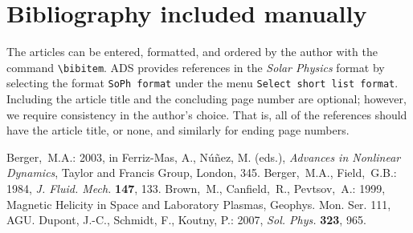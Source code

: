 \documentclass[namedreferences,hyperref,optionalrh]{spr-sola}
\newcommand{\solphys}{{\it Sol. Phys.}}
\begin{document}
\section*{Bibliography included manually }
  The articles can be entered, formatted, and ordered  
by the author with the command \verb+\bibitem+.  ADS provides
references in the {\it Solar Physics} format by selecting
the format \verb+SoPh format+ under the menu 
\verb+Select short list format+.    Including the article title
and the concluding page number are optional;
however, we require consistency in the author's choice.
That is, all of the references should have the article title, or none,
and similarly for ending page numbers.

\begin{thebibliography}{}
Berger,~M.A.: 
2003, in Ferriz-Mas, A., N{\'u}{\~n}ez, M. (eds.),
\textit{Advances in Nonlinear Dynamics}, Taylor and Francis Group, 
London, 345.
Berger,~M.A., Field,~G.B.: 
1984, \textit{J. Fluid. Mech.} \textbf{147}, 133.
Brown,~M., Canfield,~R., Pevtsov,~A.:
1999, Magnetic Helicity in Space and Laboratory Plasmas, Geophys. Mon. 
Ser. 111, AGU.
Dupont, J.-C., Schmidt, F., Koutny, P.: 2007, \solphys{} \textbf{323}, 965. 
\end{thebibliography}
\end{document}
